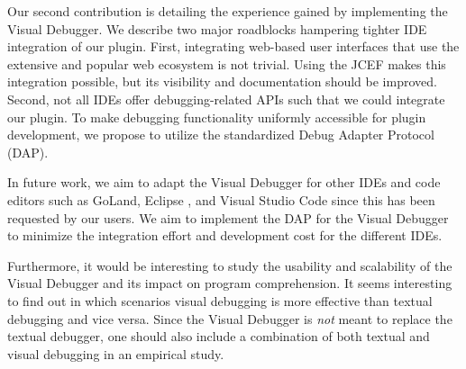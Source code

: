 \documentclass[sigconf]{acmart}
\begin{document}
Our second contribution is detailing the experience gained by implementing the Visual Debugger.
We describe two major roadblocks hampering tighter IDE integration of our plugin.
First, integrating web-based user interfaces that use the extensive and popular web ecosystem is not trivial.
Using the JCEF makes this integration possible, but its visibility and documentation should be improved.
Second, not all IDEs offer debugging-related APIs such that we could integrate our plugin.
To make debugging functionality uniformly accessible for plugin development, we propose to utilize the standardized Debug Adapter Protocol (DAP).

In future work, we aim to adapt the Visual Debugger for other IDEs and code editors such as GoLand, Eclipse \cite{desrivieresEclipsePlatformIntegrating2004}, and Visual Studio Code since this has been requested by our users.
We aim to implement the DAP for the Visual Debugger to minimize the integration effort and development cost for the different IDEs.

Furthermore, it would be interesting to study the usability and scalability of the Visual Debugger and its impact on program comprehension.
It seems interesting to find out in which scenarios visual debugging is more effective than textual debugging and vice versa.
Since the Visual Debugger is \textit{not} meant to replace the textual debugger, one should also include a combination of both textual and visual debugging in an empirical study.


\renewcommand\UrlFont{\color{black}}



\end{document}
